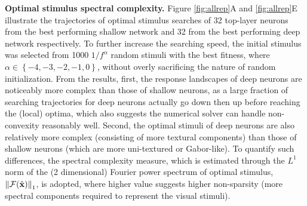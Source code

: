 \documentclass[10pt,twocolumn,letterpaper]{article}
\begin{document}
{\bf Optimal stimulus spectral complexity.} Figure \ref{fig:allrep}A and \ref{fig:allrep}E illustrate the trajectories of optimal stimulus searches of 32 top-layer neurons from the best performing shallow network and 32 from the best performing deep network respectively.
To further increase the searching speed, the initial stimulus {was} selected from 1000 ${1}/{f^{\alpha}}$ random stimuli with the best fitness, where $\alpha \in \left\lbrace -4,-3,-2,-1,0 \right\rbrace$, without overly sacrificing the nature of random initialization.
From the results, first, the response landscapes of deep neurons are noticeably more complex than those of shallow neurons, as a large fraction of searching trajectories for deep neurons actually go down then up before reaching the (local) optima, which also suggests the numerical solver can handle non-convexity reasonably well.
Second, the optimal stimuli of deep neurons are also relatively more complex (\ie consisting of more textural components) than those of shallow neurons (which are more uni-textured or Gabor-like).
To quantify such differences, the spectral complexity measure, which is estimated through the $L^{1}$ norm of the (2 dimensional) Fourier power spectrum of optimal stimulus, \ie $\left\| \mathcal{F}(\hat{\bf{x}}) \right\|_{1}$, is adopted, where higher value suggests higher non-sparsity (\ie more spectral components required to represent the visual stimuli).


\newcommand{\defbaseline}{Given a single inner-product neuron $f({\bf{x}}) = {\bf{w}}^{T}{\bf{x}}$ and $\left\| \bf{x} \right\| = 1$, we have $\hat{\bf{x}} = \bf{w}$ and thus $f({\bf{x}}_{\delta}) = {\hat{\bf{x}}}^{T}{\bf{x}}_{\delta} = \cos(\delta)$ by definition.}
\end{document}
